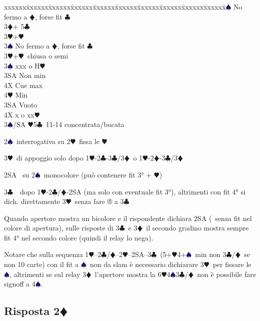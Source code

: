 \documentclass[a4paper,italian]{article}
\newcommand{\BC}{\textcolor{OliveGreen}{$\clubsuit$}}
\newcommand{\BD}{\textcolor{RedOrange}{$\vardiamondsuit$}}
\newcommand{\BH}{\textcolor{Red2}{$\varheartsuit${}}}
\newcommand{\BS}{\textcolor{MidnightBlue}{$\spadesuit${}}}
\newcommand{\pdfd}{\texorpdfstring{\BD{}}{D}}
\newenvironment{bidtable}
{\begin{tabbing}

    xxxxxx\=xxxxxx\=xxxxxx\=xxxxxx\=xxxxxx\=xxxxxx\=xxxxxx\=xxxxxx\=xxxxxx\=xxxxxx\=\kill}
{\end{tabbing} }%
\newenvironment{varie}[1]
{\begin{tcolorbox}[colframe=green!40!black,title=#1]}
    {
\end{tcolorbox} }%
\begin{document}
\begin{multicols}{2}
\begin{bidtable}
        3\BS \> No fermo a \BD , forse fit \BC \-\\
        3\BD {}+ 5\BC \+\\
        3\BH {}+\BH \\
        3\BS \> No fermo a \BD , forse fit \BC \-\\
        3\BH {}+\BH\ chiusa o semi\+\\
        3\BS \> xxx o H\BH \+\\
        3SA \> Non min\\
        4X \> Cue max\\
        4\BH \> Min\-\\
        3SA \> Vuoto\\
        4X \> x o xx\BH \-\\
        3\BS/SA \BH 5\BC\ 11-14 concentrata/bucata
    \end{bidtable}
\end{multicols}

\begin{varie}{Riepilogo mnemonico per i fissaggi}
    2\BS\ interrogativa su 2\BH\ fissa le \BH

    3\BH\ di appoggio solo dopo 1\BH-2\BC-3\BC/3\BD\ o 1\BH-2\BD-3\BC/3\BD

    2SA \textregistered\ su 2\BS\ monocolore  (può contenere fit 3° + \BH )

    3\BC\ \textregistered\ dopo 1\BH-2\BC/\BD-2SA (ma solo con eventuale fit 3°), altrimenti con fit 4° si dich.
    direttamente 3\BH\ senza fare ® a 3\BC

    Quando apertore mostra un bicolore e il rispondente dichiara 2SA
    (\textregistered\ senza fit nel colore di apertura), sulle risposte di
    3\BC\ e 3\BD\ il secondo gradino mostra sempre fit 4° nel secondo colore
    (quindi il relay lo nega).

    Notare che sulla sequenza 1\BH--2\BC/\BD--2\BH--2SA--3\BC\ (5+\BH4+\BS\ min
    non 3\BC/\BD\ se non 10 carte) con il fit a \BS\ non da slam è necessario
    dichiarare 3\BH\ per fissare le \BS, altrimenti se sul relay 3\BD\
    l'apertore mostra la 6\BH4\BS3\BC/\BD\ non è possibile fare signoff a 4\BS.

\end{varie}
\newpage

\subsection{Risposta 2\pdfd}
\end{document}
